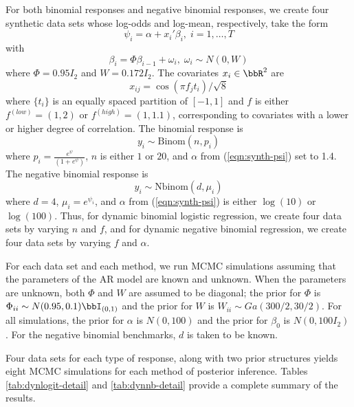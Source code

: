 \documentclass[11pt]{article}
\begin{document}
For both binomial responses and negative binomial responses, we create four
synthetic data sets whose log-odds and log-mean, respectively, take the form
\begin{equation}
\label{eqn:synth-psi}
\psi_i = \alpha + x_i' \beta_i, \; i = 1, \ldots, T
\end{equation}
with
\[
\beta_i = \Phi \beta_{i-1} + \omega_i, \; \omega_i \sim N(0, W)
\]
where $\Phi = 0.95 I_2$ and $W = 0.172 I_2$.  The covariates $x_i \in \bbR^2$
are 
\[
x_{ij} = \cos(\pi f_j t_i) / \sqrt{8}
\]
where $\{t_i\}$ is an equally spaced partition of $[-1,1]$ and $f$ is either
$f^{(low)} = (1,2)$ or $f^{(high)} = (1,1.1)$, corresponding to covariates with
a lower or higher degree of correlation.  The binomial response is
\[
y_i \sim \text{Binom}(n, p_i)
\]
where $p_i = \frac{e^{\psi}}{(1+e^{\psi})}$, $n$ is either $1$ or $20$, and
$\alpha$ from (\ref{eqn:synth-psi}) set to 1.4.  The negative binomial response
is
\[
y_i \sim \text{Nbinom}(d, \mu_i)
\]
where $d=4$, $\mu_i = e^{\psi_i}$, and $\alpha$ from (\ref{eqn:synth-psi}) is
either $\log(10)$ or $\log(100)$.  Thus, for dynamic binomial logistic
regression, we create four data sets by varying $n$ and $f$, and for dynamic
negative binomial regression, we create four data sets by varying $f$ and
$\alpha$.

For each data set and each method, we run MCMC simulations assuming that the
parameters of the AR model are known and unknown.  When the parameters are
unknown, both $\Phi$ and $W$ are assumed to be diagonal; the prior for $\Phi$ is
$\Phi_{ii} \sim N(0.95, 0.1) \bbI_{(0,1)}$ and the prior for $W$ is $W_{ii} \sim
Ga(300/2, 30/2)$.  For all simulations, the prior for $\alpha$ is $N(0, 100)$
and the prior for $\beta_0$ is $N(0, 100 I_2)$.  For the negative binomial
benchmarks, $d$ is taken to be known.

Four data sets for each type of response, along with two prior structures yields
eight MCMC simulations for each method of posterior inference.  Tables
\ref{tab:dynlogit-detail} and \ref{tab:dynnb-detail} provide a complete summary
of the results.

\end{document}
